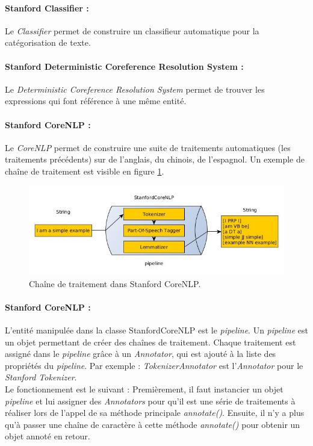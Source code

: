             \paragraph{Stanford Classifier :}
                Le \textit{Classifier} permet de construire un classifieur automatique pour la catégorisation de texte.

            \paragraph{Stanford Deterministic Coreference Resolution System :}
                Le \textit{Deterministic Coreference Resolution System} permet de trouver les expressions qui font référence à une même entité.

            \paragraph{Stanford CoreNLP :}
                Le \textit{CoreNLP} permet de construire une suite de traitements automatiques (les traitements précédents) sur de l'anglais, du chinois, de l'espagnol. Un exemple de chaîne de traitement est visible en figure \ref{fig:coreNLP}.

            \begin{figure}[h!]
                \centering
                \includegraphics[width=\textwidth]{images/coreNLP.jpg}
                \caption{Chaîne de traitement dans Stanford CoreNLP.}
                \label{fig:coreNLP}
            \end{figure}

            \paragraph{Stanford CoreNLP :}
                L'entité manipulée dans la classe StanfordCoreNLP est le \textit{pipeline}.
                Un \textit{pipeline} est un objet permettant de créer des chaînes de traitement.
                Chaque traitement est assigné dans le \textit{pipeline} grâce à un \textit{Annotator}, qui est ajouté à la liste des propriétés du \textit{pipeline}. Par exemple : \textit{TokenizerAnnotator} est l'\textit{Annotator} pour le \textit{Stanford Tokenizer}.\\
                Le fonctionnement est le suivant : Premièrement, il faut instancier un objet \textit{pipeline} et lui assigner des \textit{Annotators} pour qu'il est une série de traitements à réaliser lors de l'appel de sa méthode principale \textit{annotate()}. Ensuite, il n'y a plus qu'à passer une chaîne de caractère à cette méthode \textit{annotate()} pour obtenir un objet annoté en retour.\\

